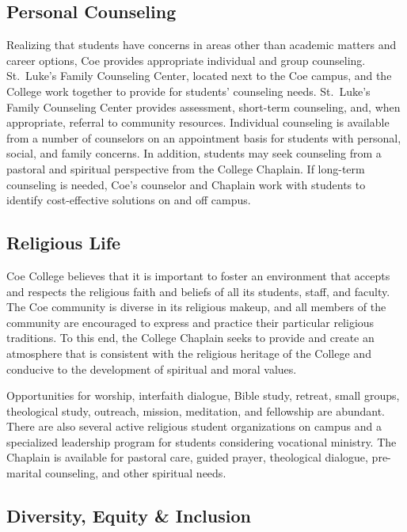 \documentclass[
  letterpaper,
]{scrbook}
\begin{document}
\subsection{Personal Counseling}\label{personal-counseling}

Realizing that students have concerns in areas other than academic
matters and career options, Coe provides appropriate individual and
group counseling. St.~Luke's Family Counseling Center, located next to
the Coe campus, and the College work together to provide for students'
counseling needs. St.~Luke's Family Counseling Center provides
assessment, short-term counseling, and, when appropriate, referral to
community resources. Individual counseling is available from a number of
counselors on an appointment basis for students with personal, social,
and family concerns. In addition, students may seek counseling from a
pastoral and spiritual perspective from the College Chaplain. If
long-term counseling is needed, Coe's counselor and Chaplain work with
students to identify cost-effective solutions on and off campus.

\subsection{Religious Life}\label{religious-life}

Coe College believes that it is important to foster an environment that
accepts and respects the religious faith and beliefs of all its
students, staff, and faculty. The Coe community is diverse in its
religious makeup, and all members of the community are encouraged to
express and practice their particular religious traditions. To this end,
the College Chaplain seeks to provide and create an atmosphere that is
consistent with the religious heritage of the College and conducive to
the development of spiritual and moral values.

Opportunities for worship, interfaith dialogue, Bible study, retreat,
small groups, theological study, outreach, mission, meditation, and
fellowship are abundant. There are also several active religious student
organizations on campus and a specialized leadership program for
students considering vocational ministry. The Chaplain is available for
pastoral care, guided prayer, theological dialogue, pre-marital
counseling, and other spiritual needs.

\subsection{Diversity, Equity \&
Inclusion}\label{diversity-equity-inclusion}
\end{document}
